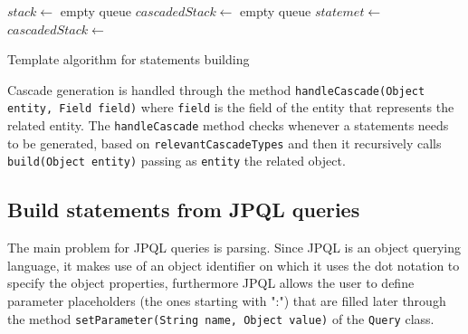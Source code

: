 \begin{algorithm}[h]
  \scriptsize
  \begin{algorithmic}[1]
    \State $stack \gets$ empty queue
    \State $cascadedStack \gets$ empty queue
	\State $statemet \gets$ 
    \State {}
          \State $cascadedStack \gets$ 
        \EndIf
          \State {}
        \Else
        	  \State {}
        	\EndIf
      \Else
          \State {}
        	\EndIf
      \EndIf
          \State {}
        \Else
          \State {}
        \EndIf
    \EndFor        
    \State {}
      \State {}
    \EndIf
  \EndFunction
  \end{algorithmic}
  \caption{Template algorithm for statements building}
  \label{code:statements-building}
\end{algorithm}

\noindent Cascade generation is handled through the method \texttt{handleCascade(Object entity, Field field)} where \texttt{field} is the field of the entity that represents the related entity. The \texttt{handleCascade} method checks whenever a statements needs to be generated, based on \texttt{relevantCascadeTypes} and then it recursively calls \texttt{build(Object entity)} passing as \texttt{entity} the related object. 

\subsection{Build statements from JPQL queries}
The main problem for JPQL queries is parsing. Since JPQL is an object querying language, it makes use of an object identifier on which it uses the dot notation to specify the object properties, furthermore JPQL allows the user to define parameter placeholders (the ones starting with ":") that are filled later through the method \texttt{setParameter(String name, Object value)} of the \texttt{Query} class.

